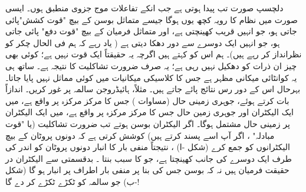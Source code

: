 دلچسپ صورت تب پیدا ہوتی ہے جب انکے  تفاعلات موج   جزوی منطبق ہوں۔ ایسی صورت میں نظام کا رویہ کچھ یوں ہوگا جیسے متماثل بوسن کے بیچ  "قوت کشش"پائی جاتی ہو،  جو انہیں قریب کھینچتی ہے،  اور  متماثل فرمیان کے بیچ "قوت دفع" پائی  جاتی ہو،  جو انہیں ایک دوسرے سے دور دھکا  دیتی  ہے ( یاد رہے کہ ہم فی الحال چکر کو نظرانداز کر رہے ہیں)۔ ہم اس کو   کہتے ہیں اگرچہ یہ حقیقتاً ایک قوت نہیں ہے؛ کوئی بھی چیز ان ذرات کو دھکیل نہیں رہی ہے؛  یہ صرف ضرورت تشاکلیت کا   نتیجہ ہے۔  ساتھ ہی یہ کوانٹائی میکانی مظہر ہے جس کا کلاسیکی میکانیات میں کوئی مماثل نہیں پایا جاتا۔ بہرحال اس کے دور رس  نتائج پائے جاتے ہیں۔ مثلاً،  ہائیڈروجن سالمہ  پر غور کریں۔ اندازاً بات کرتے ہوئے،  جوہری زمینی حال   (مساوات )   جس کا مرکز مرکزہ  پر واقع ہے، میں ایک الیکٹران اور  جوہری زمین حال جس کا مرکز مرکزہ  پر واقع ہے،   میں ایک الیکٹران  پر زمینی حال مشتمل ہوگا۔ اگر الیکٹران بوسن ہوتے تب ضرورت تشاکلیت  (یا  "قوت مبادلہ" ، اگر آپ اسے پسند کرتے ہیں) کوشش کرتی ہے کہ دونوں پروٹان کے بیچ الیکٹرانوں کو جمع کرے
 (شکل -ا)  ، نتیجتاً منفی بار کا انبار دونوں پروٹان کو اندر کی طرف ایک دوسرے کی جانب کھینچتا ہے،  جو  کا سبب بنتا ۔  بدقسمتی سے  الیکٹران  در حقیقت  فرمیان ہیں نہ کہ بوسن جس کی بنا    پر منفی بار   اطراف پر انبار  ہو گا   (شکل -ب)   جو سالمہ کو  ٹکڑے ٹکڑے کر دے  گا!

